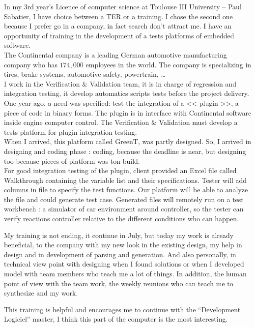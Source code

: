 \documentclass[a4paper, 12pt]{article}
\begin{document}
	\maketitle
	In my 3rd year's Licence of computer science at Toulouse III University – Paul Sabatier, I have choice between a TER or a training. I chose the second one because I prefer go in a company, in fact search don't attract me. I have an opportunity of training in the development of a tests platforms of embedded software.\\ 
	
The Continental company is a leading German automotive manufacturing company who has $174,000$ employees in the world. The company is specializing in tires, brake systems, automotive safety, powertrain, \ldots\\
I work in the Verification \& Validation team, it is in charge of regression and integration testing, it develop automatics scripts tests before the project delivery. \\

One year ago, a need was specified: test the integration of a << plugin >>, a piece of code in binary forms. The plugin is in interface with Continental software inside engine computer control. The Verification \& Validation must develop a tests platform for plugin integration testing.\\

When I arrived, this platform called GreenT, was partly designed. So, I arrived in designing and coding phase : coding, because the deadline is 	near, but designing too because pieces of platform was ton build.\\

For good integration testing of the plugin, client provided an Excel file called Walkthrough containing the variable list and their specifications. Tester will add columns in file to specify the test functions. Our platform will be able to analyze the file and could generate test case. Generated files will remotely run on a test workbench : a simulator of car environment around controller, so the tester can verify reactions controller relative to the different conditions who can happen.

My training is not ending, it continue in July, but today my work is already beneficial, to the company with my new look in the existing design, my help in design and in development of parsing and generation. And also personally, in technical view point with designing when I found solutions or when I developed model with team members who teach me a lot of things. In addition, the human point of view with the team work, the weekly reunions who can teach me to synthesize and my work.

This training is helpful and encourages me to continue with the “Development Logiciel” master, I think this part of the computer is the most interesting.
\end{document}
